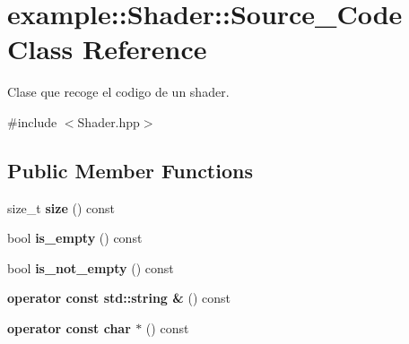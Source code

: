 \hypertarget{classexample_1_1_shader_1_1_source___code}{}\section{example\+::Shader\+::Source\+\_\+\+Code Class Reference}
\label{classexample_1_1_shader_1_1_source___code}


Clase que recoge el codigo de un shader.  




{\ttfamily \#include $<$Shader.\+hpp$>$}

\subsection*{Public Member Functions}
\begin{DoxyCompactItemize}
\item 
\mbox{\label{classexample_1_1_shader_1_1_source___code_a292ec182f1e3e7440bbda037c25df24c}} 
size\+\_\+t {\bfseries size} () const
\item 
\mbox{\label{classexample_1_1_shader_1_1_source___code_ab3ffac64d2530fbd4fe51b9c7835afda}} 
bool {\bfseries is\+\_\+empty} () const
\item 
\mbox{\label{classexample_1_1_shader_1_1_source___code_a316341560e88e77b03b1a7e0cdcaff57}} 
bool {\bfseries is\+\_\+not\+\_\+empty} () const
\item 
\mbox{\label{classexample_1_1_shader_1_1_source___code_a61fcc5c271673f67740263735e40759d}} 
{\bfseries operator const std\+::string \&} () const
\item 
\mbox{\label{classexample_1_1_shader_1_1_source___code_ae9f1b732bad5360c81abdf0912cb0f9e}} 
{\bfseries operator const char $\ast$} () const
\end{DoxyCompactItemize}
